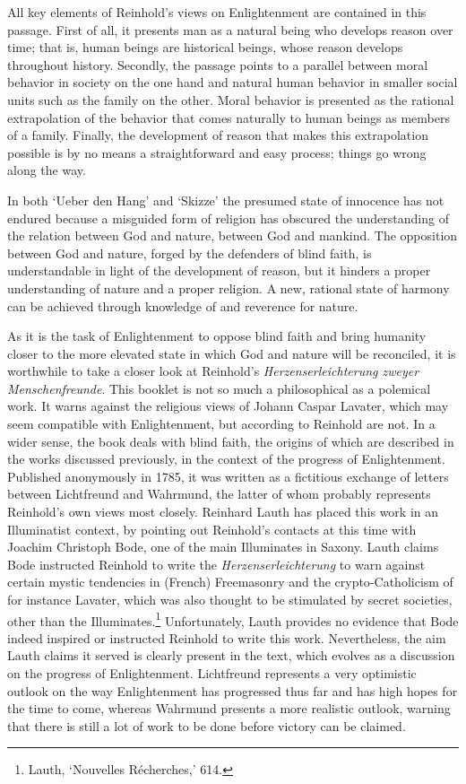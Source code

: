 All key elements of Reinhold's views on Enlightenment are contained in this passage. First of all, it presents man as a natural being who develops reason over time; that is, human beings are historical beings, whose reason develops throughout history. Secondly, the passage points to a parallel between moral behavior in society on the one hand and natural human behavior in smaller social units such as the family on the other. Moral behavior is presented as the rational extrapolation of the behavior that comes naturally to human beings as members of a family. Finally, the development of reason that makes this extrapolation possible is by no means a straightforward and easy process; things go wrong along the way. 

 In both `Ueber den Hang' and `Skizze' the presumed state of innocence has not endured because a misguided form of religion has obscured the understanding of the relation between God and nature, between God and mankind. The opposition between God and nature, forged by the defenders of blind faith, is understandable in light of the development of reason, but it hinders a proper understanding of nature and a proper religion. A new, rational state of harmony can be achieved through knowledge of and reverence for nature.  

As it is the task of Enlightenment to oppose blind faith and bring humanity closer to the more elevated state in which God and nature will be reconciled, it is worthwhile to take a closer look at Reinhold's \textit{Herzenserleichterung zweyer Menschenfreunde}. This booklet is not so much a philosophical as a polemical work. It warns against the religious views of Johann Caspar Lavater, which may seem compatible with Enlightenment, but according to Reinhold are not. In a wider sense, the book deals with blind faith, the origins of which are described in the works discussed previously, in the context of the progress of Enlightenment. Published anonymously in 1785, it was written as a fictitious exchange of letters between Lichtfreund and Wahrmund, the latter of whom probably represents Reinhold's own views most closely. Reinhard Lauth has placed this work in an Illuminatist context, by pointing out Reinhold's contacts at this time with Joachim Christoph Bode, one of the main Illuminates in Saxony. Lauth claims Bode instructed Reinhold to write the \textit{Herzenserleichterung} to warn against certain mystic tendencies in (French) Freemasonry and the crypto{-}Catholicism of for instance Lavater, which was also thought to be stimulated by secret societies, other than the Illuminates.\footnote{ Lauth, `Nouvelles R\'{e}cherches,' 614.} Unfortunately, Lauth provides no evidence that Bode indeed inspired or instructed Reinhold to write this work. Nevertheless, the aim Lauth claims it served is clearly present in the text, which evolves as a discussion on the progress of Enlightenment. Lichtfreund represents a very optimistic outlook on the way Enlightenment has progressed thus far and has high hopes for the time to come, whereas Wahrmund presents a more realistic outlook, warning that there is still a lot of work to be done before victory can be claimed. 

